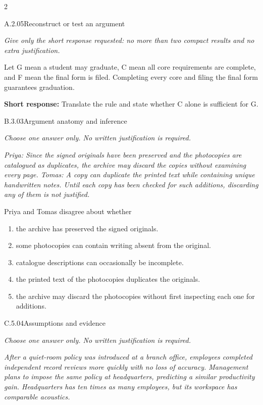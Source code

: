 \documentclass[9pt]{extarticle}
\newcommand{\choice}[1]{\item #1}
\begin{document}
\begin{multicols}{2}
\begin{DenseCoreProblem}{A.2.05}{Reconstruct or test an argument}
{\scriptsize\textit{Give only the short response requested: no more than two compact results and no extra justification.}\par}
Let G mean a student may graduate, C mean all core requirements are complete, and F mean the final form is filed. Completing every core and filing the final form guarantees graduation.

\textbf{Short response:} Translate the rule and state whether C alone is sufficient for G.
\end{DenseCoreProblem}
\begin{DenseCoreProblem}{B.3.03}{Argument anatomy and inference}
{\scriptsize\textit{Choose one answer only. No written justification is required.}\par}
\emph{Priya: Since the signed originals have been preserved and the photocopies are catalogued as duplicates, the archive may discard the copies without examining every page. Tomas: A copy can duplicate the printed text while containing unique handwritten notes. Until each copy has been checked for such additions, discarding any of them is not justified.}

Priya and Tomas disagree about whether
\begin{enumerate}[label=(\alph*)]
  \choice{the archive has preserved the signed originals.}
  \choice{some photocopies can contain writing absent from the original.}
  \choice{catalogue descriptions can occasionally be incomplete.}
  \choice{the printed text of the photocopies duplicates the originals.}
  \choice{the archive may discard the photocopies without first inspecting each one for additions.}
\end{enumerate}
\end{DenseCoreProblem}
\columnbreak
\begin{DenseCoreProblem}{C.5.04}{Assumptions and evidence}
{\scriptsize\textit{Choose one answer only. No written justification is required.}\par}
\emph{After a quiet-room policy was introduced at a branch office, employees completed independent record reviews more quickly with no loss of accuracy. Management plans to impose the same policy at headquarters, predicting a similar productivity gain. Headquarters has ten times as many employees, but its workspace has comparable acoustics.}


\end{DenseCoreProblem}
\end{multicols}
\end{document}
